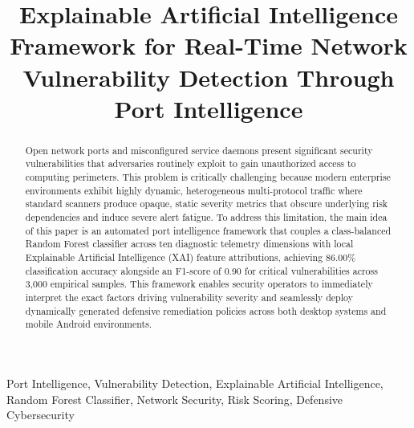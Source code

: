 \documentclass[conference]{IEEEtran}
\begin{document}
\title{Explainable Artificial Intelligence Framework for Real-Time Network Vulnerability Detection Through Port Intelligence}

\author{
\and
{}
}

\maketitle

\begin{abstract}
Open network ports and misconfigured service daemons present significant security vulnerabilities that adversaries routinely exploit to gain unauthorized access to computing perimeters. This problem is critically challenging because modern enterprise environments exhibit highly dynamic, heterogeneous multi-protocol traffic where standard scanners produce opaque, static severity metrics that obscure underlying risk dependencies and induce severe alert fatigue. To address this limitation, the main idea of this paper is an automated port intelligence framework that couples a class-balanced Random Forest classifier across ten diagnostic telemetry dimensions with local Explainable Artificial Intelligence (XAI) feature attributions, achieving 86.00\% classification accuracy alongside an F1-score of 0.90 for critical vulnerabilities across 3,000 empirical samples. This framework enables security operators to immediately interpret the exact factors driving vulnerability severity and seamlessly deploy dynamically generated defensive remediation policies across both desktop systems and mobile Android environments.
\end{abstract}

\begin{IEEEkeywords}
Port Intelligence, Vulnerability Detection, Explainable Artificial Intelligence, Random Forest Classifier, Network Security, Risk Scoring, Defensive Cybersecurity
\end{IEEEkeywords}
\end{document}
